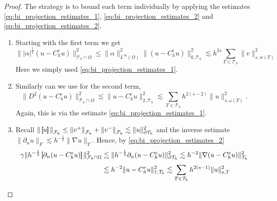 \begin{proof}
    The strategy is to bound each term individually by applying the estimates \eqref{eq:bi_projection_estimates_1}, \eqref{eq:bi_projection_estimates_2} and \eqref{eq:bi_projection_estimates_2}.
    \begin{enumerate}[label=\arabic*)]
        \item     Starting with the first term we get
    \[
            \| |\alpha |^{\frac{1}{2}} ( u - C_{h}^{e}u) \|_{ \mathcal{T} _{h} \cap \Omega  }^{ 2}  \le  \| \alpha  \|_{L^\infty ( \Omega )    }^{2  }   \|  ( u - C_{h}^{e}u) \|_{0,\mathcal{T} _{h}  }^{ 2} \lesssim  h^{2s} \sum_{T \in \mathcal{T}
            _{h}}^{}   \| v \|_{s,w( T)  }^{  2}
    \]
    Here we simply used \eqref{eq:bi_projection_estimates_1}.
\item
    Similarly can we use  for the second term, \[
    \| D^2 ( u - C_{h}^{e}u ) \|_{\mathcal{T} _{h} \cap \Omega   }^{ 2 } \lesssim  \|  u - C_{h}^{e}u  \|_{2,\mathcal{T} _{h}   }^{ 2 } \lesssim \sum_{T \in \mathcal{T} _{h}}^{} h^{2(s-2)} \| u \|_{ s, \omega ( T)  }^{ 2 }.
    \]
    Again, this is via the estimate \eqref{eq:bi_projection_estimates_1}.
\item
        Recall $\| \left[\!\!\left[  u  \right]\!\!\right]   \|_{ \mathcal{F} _{h} }^{  } \le \| v^{+}   \|_{ \mathcal{F} _{h} }^{  } +   \| v^{-}   \|_{ \mathcal{F} _{h} }^{  } \lesssim  \| u \|_{ \partial\mathcal{T }_{h}  }^{2  }  $ and the inverse estimate $\| \partial _{n} u \|_{ F  }^{} \lesssim h^{-\frac{1}{2}} \| \nabla u \|_{ T }^{  }  $.
     Hence, by \eqref{eq:bi_projection_estimates_2}  \[
        \begin{split}
            \gamma \| h^{-\frac{1}{2}} \left[\!\!\left[  \partial _{n} ( u - C_{h}^{e}u )  \right]\!\!\right]   \|_{ \mathcal{F}_{h} \cap \Omega   }^{  2}   &\lesssim \| h^{-\frac{1}{2}}  \partial _{n} ( u - C_{h}^{e}u )    \|_{  \partial \mathcal{T} _{h} }^{2  }
       \lesssim h^{-2} \|   \nabla  ( u - C_{h}^{e}u )    \|_{  \mathcal{T} _{h} }^{2  }     \\
                                                                                                                 &\lesssim h^{-2} \|      u - C_{h}^{e}u     \|_{1,  \mathcal{T}_{h} }^{2  }
                                                                                                                 \lesssim \sum_{T \in \mathcal{T} _{h}}^{} h^{2(s-1)} \| u \|_{ s,T  }^{ 2}
        \end{split}
    \]
\end{enumerate}
\end{proof}
